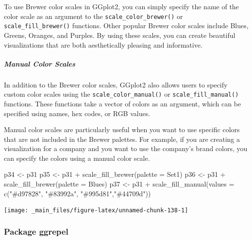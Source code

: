 \documentclass[
]{book}
\newenvironment{Shaded}{\begin{snugshade}}{\end{snugshade}}
\newcommand{\AttributeTok}[1]{\textcolor[rgb]{0.77,0.63,0.00}{#1}}
\newcommand{\FunctionTok}[1]{\textcolor[rgb]{0.00,0.00,0.00}{#1}}
\newcommand{\NormalTok}[1]{#1}
\newcommand{\OtherTok}[1]{\textcolor[rgb]{0.56,0.35,0.01}{#1}}
\newcommand{\SpecialCharTok}[1]{\textcolor[rgb]{0.00,0.00,0.00}{#1}}
\newcommand{\StringTok}[1]{\textcolor[rgb]{0.31,0.60,0.02}{#1}}
\begin{document}
To use Brewer color scales in GGplot2, you can simply specify the name of the color scale as an argument to the \texttt{scale\_color\_brewer()} or \texttt{scale\_fill\_brewer()} functions. Other popular Brewer color scales include Blues, Greens, Oranges, and Purples. By using these scales, you can create beautiful visualizations that are both aesthetically pleasing and informative.

\hypertarget{manual-color-scales}{%
\subparagraph*{Manual Color Scales}\label{manual-color-scales}}

In addition to the Brewer color scales, GGplot2 also allows users to specify custom color scales using the \texttt{scale\_color\_manual()} or \texttt{scale\_fill\_manual()} functions. These functions take a vector of colors as an argument, which can be specified using names, hex codes, or RGB values.

Manual color scales are particularly useful when you want to use specific colors that are not included in the Brewer palettes. For example, if you are creating a visualization for a company and you want to use the company's brand colors, you can specify the colors using a manual color scale.

\begin{Shaded}
\begin{Highlighting}[]
\NormalTok{p34 }\OtherTok{\textless{}{-}}\NormalTok{ p31}
\NormalTok{p35 }\OtherTok{\textless{}{-}}\NormalTok{ p31 }\SpecialCharTok{+} \FunctionTok{scale\_fill\_brewer}\NormalTok{(}\AttributeTok{palette =} \StringTok{\textquotesingle{}Set1\textquotesingle{}}\NormalTok{)}
\NormalTok{p36 }\OtherTok{\textless{}{-}}\NormalTok{ p31 }\SpecialCharTok{+} \FunctionTok{scale\_fill\_brewer}\NormalTok{(}\AttributeTok{palette =} \StringTok{\textquotesingle{}Blues\textquotesingle{}}\NormalTok{)}
\NormalTok{p37 }\OtherTok{\textless{}{-}}\NormalTok{ p31 }\SpecialCharTok{+} \FunctionTok{scale\_fill\_manual}\NormalTok{(}\AttributeTok{values =} \FunctionTok{c}\NormalTok{(}\StringTok{"\#d97828"}\NormalTok{, }\StringTok{"\#83992a"}\NormalTok{, }\StringTok{"\#995d81"}\NormalTok{,}\StringTok{"\#44709d"}\NormalTok{))}
\end{Highlighting}
\end{Shaded}

\begin{center}\texttt{[image: \_main\_files/figure-latex/unnamed-chunk-138-1]} \end{center}

\hypertarget{package-ggrepel}{%
\subsubsection*{Package ggrepel}\label{package-ggrepel}}
\end{document}
